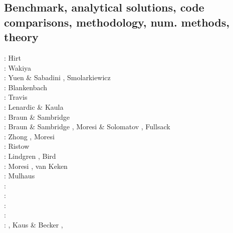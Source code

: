 \subsection{Benchmark, analytical solutions, code comparisons, methodology, num. methods, theory}

\begin{scriptsize}
\nineteenseventyfour: Hirt \etal \cite{hiac74}\\
\nineteenseventyfive: Wakiya \cite{waki75a,waki75b}\\
\nineteeneightyfour: Yuen \& Sabadini \cite{yusa84}, Smolarkiewicz \cite{smol84}\\
\nineteeneightynine: Blankenbach \etal \cite{blbc89}\\
\nineteenninety: Travis \etal \cite{trab90}\\
\nineteenninetythree: Lenardic \& Kaula \cite{leka93}\\
\nineteenninetyfour: Braun \& Sambridge \cite{brsa94}\\
\nineteenninetyfive: Braun \& Sambridge \cite{brsa95}, Moresi \& Solomatov \cite{moso95}, 
                     Fullsack \cite{full95}\\
\nineteenninetysix: Zhong \cite{zhon96}, Moresi \etal \cite{mozg96}\\
\nineteenninetyseven: Ristow \cite{rist97}\\
\nineteenninetynine: Lindgren \cite{lind99}, Bird \cite{bird99}\\
\twothousandone: Moresi \etal\cite{modm01}, van Keken \cite{vank01}\\
\twothousandtwo: Mulhaus \etal \cite{mudm02}\\
\twothousandthree: \cite{taki03}\cite{modm03}\cite{geyu03}\cite{geyu03b}\cite{taxi03}\cite{scpo03}\\
\twothousandfour: \cite{kaps04}\cite{kasa04}\cite{kaks08}\cite{mumc04}\\
\twothousandfive: \cite{mure05}\\
\twothousandsix: \cite{kapo06}\cite{more06}\cite{onmm06}\cite{mudm06}\cite{tact06}\\
\twothousandseven: \cite{toma07}\cite{chcc07}, Kaus \& Becker \cite{kabe07}, \cite{kaks07}\cite{moql07}\cite{geyu07}\cite{dadh07}

\end{scriptsize}
